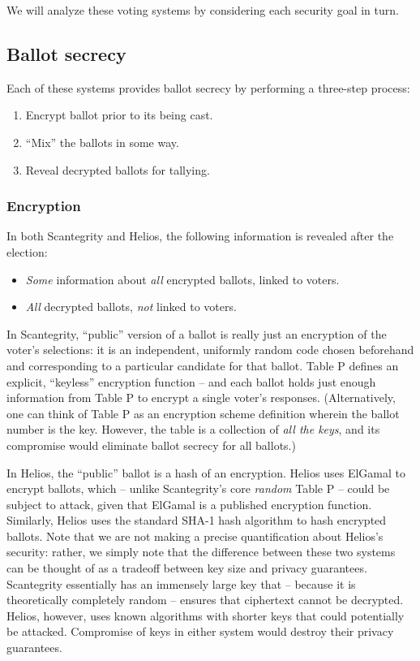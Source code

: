\documentclass[10pt]{article}
\begin{document}
\begin{multicols}{2}
We will analyze these voting systems by considering each security goal in turn.

\subsection{Ballot secrecy}

Each of these systems provides ballot secrecy by performing a three-step process:
\begin{enumerate}
	\item
		Encrypt ballot prior to its being cast.
	\item
		``Mix'' the ballots in some way.
	\item
		Reveal decrypted ballots for tallying.
\end{enumerate}

\subsubsection{Encryption}

In both Scantegrity and Helios, the following information is revealed after the election:
\begin{itemize}
	\item
		\emph{Some} information about \emph{all} encrypted ballots, linked to voters.
	\item
		\emph{All} decrypted ballots, \emph{not} linked to voters.
\end{itemize}

In Scantegrity, ``public'' version of a ballot is really just an encryption of the voter's
selections: it is an independent, uniformly random code chosen beforehand and corresponding to a
particular candidate for that ballot. Table P defines an explicit, ``keyless'' encryption
function -- and each ballot holds just enough information from Table P to encrypt a single voter's
responses. (Alternatively, one can think of Table P as an encryption scheme definition wherein the
ballot number is the key. However, the table is a collection of \emph{all the keys}, and its
compromise would eliminate ballot secrecy for all ballots.)

In Helios, the ``public'' ballot is a hash of an encryption. Helios uses ElGamal to encrypt ballots,
which -- unlike Scantegrity's core \emph{random} Table P -- could be subject to attack, given that
ElGamal is a published encryption function. Similarly, Helios uses the standard SHA-1 hash algorithm
to hash encrypted ballots. Note that we are not making a precise quantification about Helios's
security: rather, we simply note that the difference between these two systems can be thought of as
a tradeoff between key size and privacy guarantees. Scantegrity essentially has an immensely large
key that -- because it is theoretically completely random -- ensures that ciphertext cannot be
decrypted. Helios, however, uses known algorithms with shorter keys that could potentially be
attacked. Compromise of keys in either system would destroy their privacy guarantees.


\end{multicols}
\end{document}
